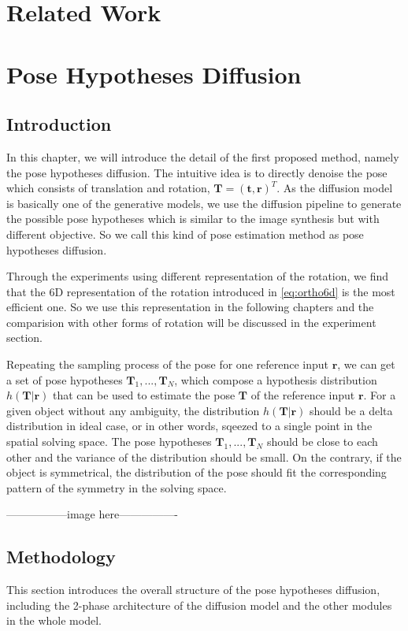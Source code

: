 \documentclass[12pt,DIV14,BCOR12mm,a4paper,footinclude=false,headinclude,parskip=half-,twoside,openright,cleardoublepage=empty,toc=index,bibliography=totoc,listof=totoc]{scrreprt}
\numberwithin{equation}{chapter}
\begin{document}
\chapter{Related Work}

\chapter{Pose Hypotheses Diffusion}
\section{Introduction}
In this chapter, we will introduce the detail of the first proposed method, namely the pose hypotheses diffusion. The intuitive idea is to directly denoise the pose which consists of translation and rotation, $\mathbf{T} = (\mathbf{t}, \mathbf{r})^{T}$. As the diffusion model is basically one of the generative models, we use the diffusion pipeline to generate the possible pose hypotheses which is similar to the image synthesis but with different objective. So we call this kind of pose estimation method as pose hypotheses diffusion.

Through the experiments using different representation of the rotation, we find that the 6D representation of the rotation introduced in \ref{eq:ortho6d} is the most efficient one. So we use this representation in the following chapters and the comparision with other forms of rotation will be discussed in the experiment section.

Repeating the sampling process of the pose for one reference input $\mathbf{r}$, we can get a set of pose hypotheses $\mathbf{T}_{1},...,\mathbf{T}_{N}$, which compose a hypothesis distribution $h(\mathbf{T}|\mathbf{r})$ that can be used to estimate the pose $\mathbf{T}$ of the reference input $\mathbf{r}$. For a given object without any ambiguity, the distribution $h(\mathbf{T}|\mathbf{r})$ should be a delta distribution in ideal case, or in other words, sqeezed to a single point in the spatial solving space. The pose hypotheses $\mathbf{T}_{1},...,\mathbf{T}_{N}$ should be close to each other and the variance of the distribution should be small. On the contrary, if the object is symmetrical, the distribution of the pose should fit the corresponding pattern of the symmetry in the solving space.

-----------------image here----------------

\section{Methodology}
This section introduces the overall structure of the pose hypotheses diffusion, 
including the 2-phase architecture of the diffusion model and the other modules in the whole model.
\end{document}

